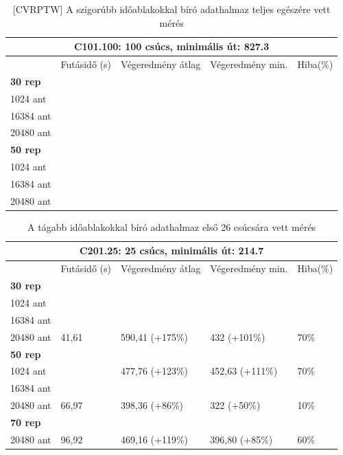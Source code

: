 \begin{table}[ht!]
	\centering
	\begin{tabular}{|p{1.75cm}||p{2cm}|p{3.25cm}|p{3.25cm}|p{1.5cm}|}
		\hline
		\multicolumn{5}{|c|}{C101.100: 100 csúcs, minimális út: 827.3} \\
		\hline
		& Futásidő (s) & Végeredmény átlag & Végeredmény min. & Hiba(\%) \\
		\hline
		\textbf{30 rep} &  &  &  &  \\
		1024 ant &  &  &  &  \\
		16384 ant & &  &  &  \\
		20480 ant &  &  &  &  \\
		\hline
		\textbf{50 rep} &  &  &  &  \\
		1024 ant &  &  &  &  \\
		16384 ant &  &  &  &  \\
		20480 ant &  &  &  &  \\
		\hline
	\end{tabular}
	\caption{[CVRPTW] A szigorúbb időablakokkal bíró adathalmaz teljes egészére vett mérés}
	\label{table:VRTPW_100_1}
\end{table}

\begin{table}[ht!]
	\centering
	\begin{tabular}{|p{1.75cm}||p{2cm}|p{3.25cm}|p{3.25cm}|p{1.5cm}|}
		\hline
		\multicolumn{5}{|c|}{C201.25: 25 csúcs, minimális út: 214.7} \\
		\hline
		& Futásidő (s) & Végeredmény átlag & Végeredmény min. & Hiba(\%) \\
		\hline
		\textbf{30 rep} &  &  &  &  \\
		1024 ant &  &  &  &  \\
		16384 ant &  &  &  &  \\
		20480 ant & 41,61 & 590,41 (+175\%) & 432 (+101\%) & 70\%  \\
		\hline
		\textbf{50 rep} &  &  &  &  \\
		1024 ant &  & 477,76 (+123\%) & 452,63 (+111\%) & 70\% \\
		16384 ant &  &  &  &  \\
		20480 ant & 66,97 & 398,36 (+86\%) & 322 (+50\%) & 10\% \\
		\hline
		\textbf{70 rep} &  &  &  &  \\
		20480 ant & 96,92 & 469,16 (+119\%) & 396,80 (+85\%) & 60\% \\
		\hline
	\end{tabular}
	\caption{A tágabb időablakokkal bíró adathalmaz első 26 csúcsára vett mérés}
	\label{table:VRTPW_25_2}
\end{table}

